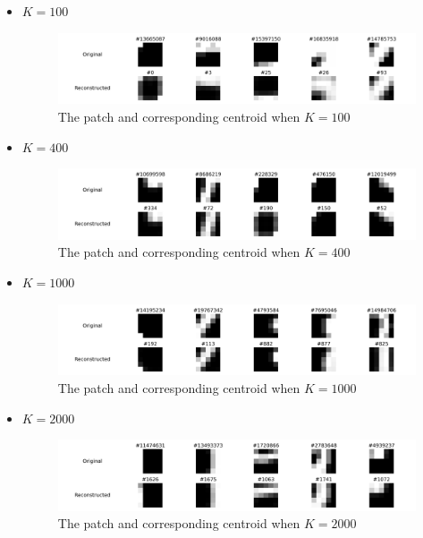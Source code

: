 \documentclass{article}
\begin{document}
\begin{itemize}
    \item $K = 100$
    \begin{figure}[htbp!]
        \centering
        \includegraphics[width = 0.9 \textwidth]{K-means/Result/Patches/100-clusters-reconstruction.png}
        \caption{The patch and corresponding centroid when $K = 100$}
        \label{fig:patches-100}
    \end{figure}

        \item $K = 400$
    \begin{figure}[htbp!]
        \centering
        \includegraphics[width = 0.9 \textwidth]{K-means/Result/Patches/400-clusters-reconstruction.png}
        \caption{The patch and corresponding centroid when $K = 400$}
        \label{fig:patches-400}
    \end{figure}

        \item $K = 1000$
    \begin{figure}[htbp!]
        \centering
        \includegraphics[width = 0.9 \textwidth]{K-means/Result/Patches/1000-clusters-reconstruction.png}
        \caption{The patch and corresponding centroid when $K = 1000$}
        \label{fig:patches-1000}
    \end{figure}
    \clearpage

        \item $K = 2000$
    \begin{figure}[htbp!]
        \centering
        \includegraphics[width = 0.9 \textwidth]{K-means/Result/Patches/2000-clusters-reconstruction.png}
        \caption{The patch and corresponding centroid when $K = 2000$}
        \label{fig:patches-2000}
    \end{figure}


\end{itemize}
\end{document}
